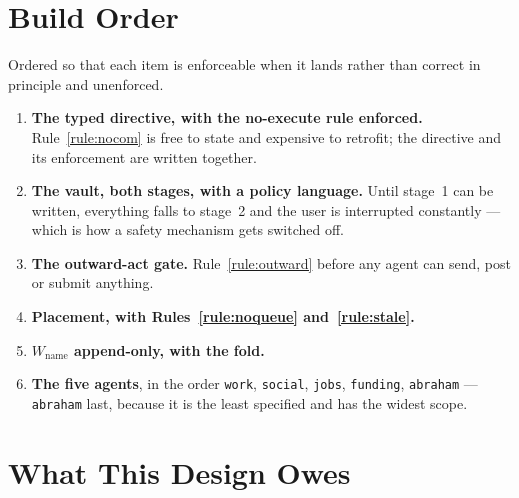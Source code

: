 \documentclass[11pt]{article}
\newcommand{\code}[1]{\texttt{\small #1}}
\begin{document}
\section{Build Order}
\label{sec:build}

Ordered so that each item is enforceable when it lands rather than correct in principle and unenforced.

\begin{enumerate}
\item \textbf{The typed directive, with the no-execute rule enforced.} Rule~\ref{rule:nocom} is free to state and expensive to retrofit; the directive and its enforcement are written together.
\item \textbf{The vault, both stages, with a policy language.} Until stage~1 can be written, everything falls to stage~2 and the user is interrupted constantly --- which is how a safety mechanism gets switched off.
\item \textbf{The outward-act gate.} Rule~\ref{rule:outward} before any agent can send, post or submit anything.
\item \textbf{Placement, with Rules~\ref{rule:noqueue} and~\ref{rule:stale}.}
\item \textbf{$W_{\text{name}}$ append-only, with the fold.}
\item \textbf{The five agents}, in the order \code{work}, \code{social}, \code{jobs}, \code{funding}, \code{abraham} --- \code{abraham} last, because it is the least specified and has the widest scope.
\end{enumerate}

\section{What This Design Owes}
\label{sec:owed}
\end{document}
